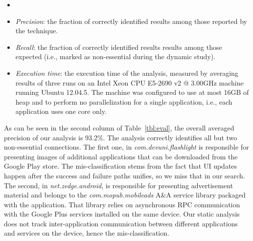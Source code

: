 \begin{itemize}[leftmargin=0.5cm]%
\item
\item
\emph{Precision}: the fraction of correctly identified results among those reported by the technique.
\item
\emph{Recall}: the fraction of correctly identified results results among those expected (i.e., marked as non-essential during the dynamic study). 
\item \emph{Execution time}: the execution time of the analysis, measured by averaging results of
three runs on an Intel\textsuperscript{\textregistered} Xeon\textsuperscript{\textregistered} CPU E5-2690 v2 @ 3.00GHz machine running Ubuntu 12.04.5. The machine was configured to use at most 16GB of heap and to perform no parallelization for a single application, i.e., each application uses one core only.
\end{itemize}
  
As can be seen in the second column of Table~\ref{tbl:eval}, the overall averaged precision of our analysis is 93.2\%. 
The analysis correctly identifies all but two non-essential connections. 
The first one, in \emph{com.devuni.flashlight} is responsible for presenting images of additional applications that can be downloaded from the Google Play store. The mis-classification stems from the fact that UI updates happen after the success and failure paths unifies, so we miss that in our search. 
The second, in \emph{net.zedge.android}, is responsible for presenting advertisement material and belongs to the \emph{com.mopub.mobileads} A\&A service library packaged with the application. 
That library relies on asynchronous RPC communication with the Google Plus services 
installed on the same device. Our static analysis does not track inter-application communication between different applications and services on the device, hence the mis-classification.   
 
